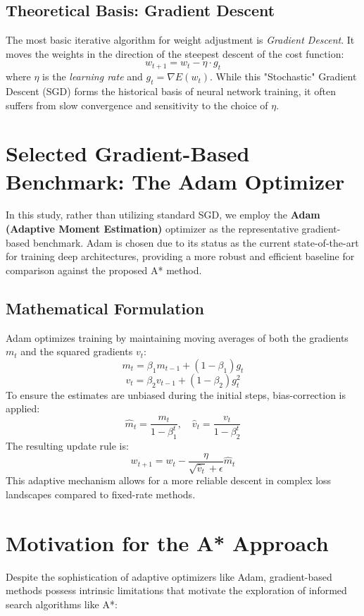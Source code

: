 \subsection{Theoretical Basis: Gradient Descent}
The most basic iterative algorithm for weight adjustment is \textit{Gradient Descent}. It moves the weights in the direction of the steepest descent of the cost function:
$$w_{t+1} = w_t - \eta \cdot g_t$$
where $\eta$ is the \textit{learning rate} and $g_t = \nabla E(w_t)$. While this "Stochastic" Gradient Descent (SGD) forms the historical basis of neural network training, it often suffers from slow convergence and sensitivity to the choice of $\eta$.

\section{Selected Gradient-Based Benchmark: The Adam Optimizer}
\label{sec:adam_choice}
In this study, rather than utilizing standard SGD, we employ the \textbf{Adam (Adaptive Moment Estimation)} optimizer as the representative gradient-based benchmark. Adam is chosen due to its status as the current state-of-the-art for training deep architectures, providing a more robust and efficient baseline for comparison against the proposed A* method.

\subsection{Mathematical Formulation}
Adam optimizes training by maintaining moving averages of both the gradients $m_t$ and the squared gradients $v_t$:
$$m_t = \beta_1 m_{t-1} + (1 - \beta_1) g_t$$
$$v_t = \beta_2 v_{t-1} + (1 - \beta_2) g_t^2$$
To ensure the estimates are unbiased during the initial steps, bias-correction is applied:
$$\hat{m}_t = \frac{m_t}{1 - \beta_1^t}, \quad \hat{v}_t = \frac{v_t}{1 - \beta_2^t}$$
The resulting update rule is:
$$w_{t+1} = w_t - \frac{\eta}{\sqrt{\hat{v}_t} + \epsilon} \hat{m}_t$$
This adaptive mechanism allows for a more reliable descent in complex loss landscapes compared to fixed-rate methods.



\section{Motivation for the A* Approach}
Despite the sophistication of adaptive optimizers like Adam, gradient-based methods possess intrinsic limitations that motivate the exploration of informed search algorithms like A*:

